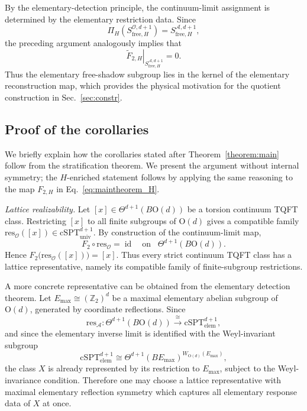 \documentclass[aps,prx,reprint,superscriptaddress,twocolumn,amsmath,amssymb,amsfonts, nofootinbib]{revtex4-2}
\newcommand{\res}{\text{res}}
\theoremstyle{apsstyle}
\begin{document}
By the elementary-detection principle, the continuum-limit assignment is
determined by the elementary restriction data. Since
\begin{equation*}
\Pi_H\left(
S_{\mathrm{free},H}^{\mathcal O,d+1}
\right)
=
S_{\mathrm{free},H}^{\mathcal A,d+1},
\end{equation*}
the preceding argument analogously implies that
\begin{equation*}
\left.\widetilde F_{2,H}\right|_
{S_{\mathrm{free},H}^{\mathcal A,d+1}}
=
0.
\end{equation*}
Thus the elementary free-shadow subgroup lies in the kernel of the
elementary reconstruction map, which provides the physical motivation
for the quotient construction in Sec.~\ref{sec:constr}.


\subsection{Proof of the corollaries} \label{sec:proof_corollaries} 

We briefly explain how the corollaries stated after Theorem~\ref{theorem:main} follow from the stratification theorem. We present the argument without internal symmetry; the $H$-enriched statement follows by applying the same reasoning to the map $F_{2,H}$ in Eq.~\eqref{eq:maintheorem_H}.

\medskip 

\noindent\emph{Lattice realizability.} 
Let $[x]\in \Theta^{d+1}(B\mathrm{O}(d))$ be a torsion continuum TQFT class. Restricting $[x]$ to all finite subgroups of $\mathrm{O}(d)$ gives a compatible family $\res_{\mathcal O}([x])\in \mathrm{cSPT}^{d+1}_{\mathrm{univ}}$. By construction of the continuum-limit map, 
\begin{equation*}
F_2\circ \res_{\mathcal O} = \operatorname{id} \quad \text{on}\;\;\; \Theta^{d+1}(B\mathrm{O}(d)). 
\end{equation*}
Hence $F_2\bigl(\res_{\mathcal O}([x])\bigr)=[x]$. Thus every strict continuum TQFT class has a lattice representative, namely its compatible family of finite-subgroup restrictions. 

A more concrete representative can be obtained from the elementary detection theorem. Let $E_{\max}\cong(\mathbb Z_2)^d$ be a maximal elementary abelian subgroup of $\mathrm{O}(d)$, generated by coordinate reflections. Since \[ \res_{\mathcal A}: \Theta^{d+1}(B\mathrm{O}(d)) \xrightarrow{\;\cong\;} \mathrm{cSPT}^{d+1}_{\mathrm{elem}}, \] and since the elementary inverse limit is identified with the Weyl-invariant subgroup \[ \mathrm{cSPT}^{d+1}_{\mathrm{elem}} \cong \Theta^{d+1}(BE_{\max})^{W_{\mathrm{O}(d)}(E_{\max})}, \] the class $X$ is already represented by its restriction to $E_{\max}$, subject to the Weyl-invariance condition. Therefore one may choose a lattice representative with maximal elementary reflection symmetry which captures all elementary response data of $X$ at once.
\end{document}

